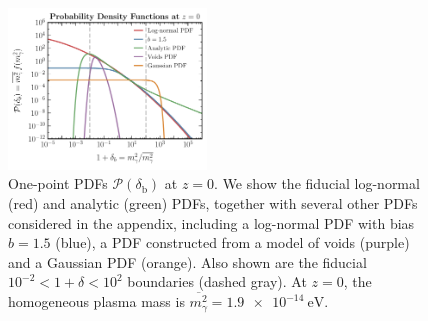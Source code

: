 \documentclass[prd,aps,10pt,nofootinbib,twocolumn,superscriptaddress,preprintnumbers,balancelastpage,longbibliography]{revtex4-1}
\begin{document}
%
\begin{figure}[tbp]
    \centering
    \includegraphics[width=0.47\textwidth]{plots/PDFs}
    \caption{One-point PDFs $\mathcal{P}(\delta_\mathrm{b})$ at $z = 0$. We show the fiducial log-normal (red) and analytic (green) PDFs, together with several other PDFs considered in the appendix, including a log-normal PDF with bias $b = 1.5$ (blue), a PDF constructed from a model of voids (purple)~\cite{Adermann:2018jba} and a Gaussian PDF (orange). Also shown are the fiducial $10^{-2} < 1+\delta < 10^2$ boundaries (dashed gray). At $z = 0$, the homogeneous plasma mass is $\overline{m_\gamma^2} = \SI{1.9e-14}{\eV}$. } 
    \label{fig:PDFs}
\end{figure}
%
\end{document}
